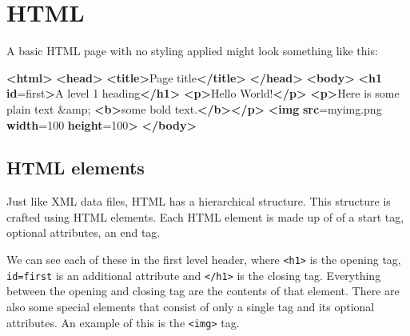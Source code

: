 \documentclass[
  12pt,
]{book}
\newenvironment{Shaded}{\begin{snugshade}}{\end{snugshade}}
\newcommand{\DecValTok}[1]{\textcolor[rgb]{0.00,0.00,0.81}{#1}}
\newcommand{\ErrorTok}[1]{\textcolor[rgb]{0.64,0.00,0.00}{\textbf{#1}}}
\newcommand{\KeywordTok}[1]{\textcolor[rgb]{0.13,0.29,0.53}{\textbf{#1}}}
\newcommand{\NormalTok}[1]{#1}
\newcommand{\OtherTok}[1]{\textcolor[rgb]{0.56,0.35,0.01}{#1}}
\newcommand{\StringTok}[1]{\textcolor[rgb]{0.31,0.60,0.02}{#1}}
\begin{document}
\hypertarget{html}{%
\section{HTML}\label{html}}

A basic HTML page with no styling applied might look something like this:

\begin{Shaded}
\begin{Highlighting}[]
\KeywordTok{\textless{}html\textgreater{}}
\KeywordTok{\textless{}head\textgreater{}}
  \KeywordTok{\textless{}title\textgreater{}}\NormalTok{Page title}\KeywordTok{\textless{}/title\textgreater{}}
\KeywordTok{\textless{}/head\textgreater{}}
\KeywordTok{\textless{}body\textgreater{}}
  \KeywordTok{\textless{}h1} \ErrorTok{id}\OtherTok{=}\StringTok{\textquotesingle{}first\textquotesingle{}}\KeywordTok{\textgreater{}}\NormalTok{A level 1 heading}\KeywordTok{\textless{}/h1\textgreater{}}
  \KeywordTok{\textless{}p\textgreater{}}\NormalTok{Hello World!}\KeywordTok{\textless{}/p\textgreater{}}
  \KeywordTok{\textless{}p\textgreater{}}\NormalTok{Here is some plain text }\DecValTok{\&amp;} \KeywordTok{\textless{}b\textgreater{}}\NormalTok{some bold text.}\KeywordTok{\textless{}/b\textgreater{}\textless{}/p\textgreater{}}
  \KeywordTok{\textless{}img} \ErrorTok{src}\OtherTok{=}\StringTok{\textquotesingle{}myimg.png\textquotesingle{}} \ErrorTok{width}\OtherTok{=}\StringTok{\textquotesingle{}100\textquotesingle{}} \ErrorTok{height}\OtherTok{=}\StringTok{\textquotesingle{}100\textquotesingle{}}\KeywordTok{\textgreater{}}
\KeywordTok{\textless{}/body\textgreater{}}
\end{Highlighting}
\end{Shaded}

\hypertarget{html-elements}{%
\subsection{HTML elements}\label{html-elements}}

Just like XML data files, HTML has a hierarchical structure. This structure is crafted using HTML elements. Each HTML element is made up of of a start tag, optional attributes, an end tag.

We can see each of these in the first level header, where \texttt{\textless{}h1\textgreater{}} is the opening tag, \texttt{id=\textquotesingle{}first\textquotesingle{}} is an additional attribute and \texttt{\textless{}/h1\textgreater{}} is the closing tag. Everything between the opening and closing tag are the contents of that element. There are also some special elements that consist of only a single tag and its optional attributes. An example of this is the \texttt{\textless{}img\textgreater{}} tag.
\end{document}
